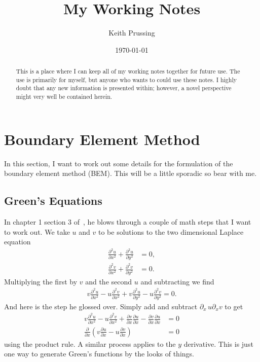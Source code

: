 \documentclass[aps,prl,reprint]{revtex4-1}
\begin{document}
\title{My Working Notes}
\author{Keith Prussing}
\date{\today}

\begin{abstract}
    This is a place where I can keep all of my working notes together
    for future use.  The use is primarily for myself, but anyone who
    wants to could use these notes.  I highly doubt that any new
    information is presented within; however, a novel perspective might
    very well be contained herein.
\end{abstract}
\maketitle

\section{Boundary Element Method}
In this section, I want to work out some details for the formulation of
the boundary element method (BEM).  This will be a little sporadic so
bear with me.

\subsection{Green's Equations}
In chapter 1 section 3 of~\cite{ang_beginners_2007}, he blows through a
couple of math steps that I want to work out.  We take \(u\) and \(v\)
to be solutions to the two dimensional Laplace equation
\begin{align*}
    \frac{\partial^2 u}{\partial x^2} + 
    \frac{\partial^2 u}{\partial y^2} &= 0, \\
    \frac{\partial^2 v}{\partial x^2} + 
    \frac{\partial^2 v}{\partial y^2} &= 0. 
\end{align*}
Multiplying the first by \(v\) and the second \(u\) and subtracting we
find
\begin{align*}
    v\frac{\partial^2 u}{\partial x^2} -
    u\frac{\partial^2 v}{\partial x^2} +
    v\frac{\partial^2 u}{\partial y^2} -
    u\frac{\partial^2 v}{\partial y^2} = 0.
\end{align*}
And here is the step he glossed over.  Simply add and subtract
\(\partial_x\,u\partial_xv\) to get
\begin{align*}
    v\frac{\partial^2 u}{\partial x^2} -
    u\frac{\partial^2 v}{\partial x^2} +
    \frac{\partial v}{\partial x}\frac{\partial u}{\partial x} -
    \frac{\partial v}{\partial x}\frac{\partial u}{\partial x} &= 0 \\
    \frac{\partial}{\partial x}\left( 
        v\frac{\partial u}{\partial x} -u\frac{\partial v}{\partial x}
    \right) &= 0
\end{align*}
using the product rule.  A similar process applies to the \(y\)
derivative.  This is just one way to generate Green's functions by the
looks of things.


\end{document}
